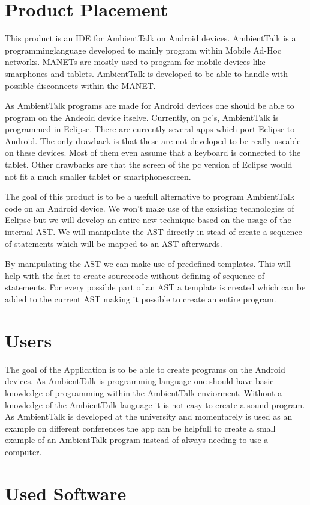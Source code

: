 \documentclass[a4paper,12pt]{report}
\begin{document}
\section{Product Placement}
This product is an IDE for AmbientTalk on Android devices. AmbientTalk is a programminglanguage developed to mainly program within Mobile Ad-Hoc networks. MANETs are mostly used to program
for mobile devices like smarphones and tablets. AmbientTalk is developed to be able to handle with possible disconnects within the MANET.

As AmbientTalk programs are made for Android devices one should be able to program on the Andeoid device itselve. Currently, on pc's, AmbientTalk is programmed in Eclipse. There are currently
several apps which port Eclipse to Android. The only drawback is that these are not developed to be really useable on these devices. Most of them even assume that a keyboard is connected to the
tablet. Other drawbacks are that the screen of the pc version of Eclipse would not fit a much smaller tablet or smartphonescreen.   

The goal of this product is to be a usefull alternative to program AmbientTalk code on an Android device. We won't make use of the exsisting technologies of Eclipse but we will develop an entire
new technique based on the usage of the internal AST. We will manipulate the AST directly in stead of create a sequence of statements which will be mapped to an AST afterwards.

By manipulating the AST we can make use of predefined templates. This will help with the fact to create sourcecode without defining of sequence of statements. For every possible part of an AST
a template is created which can be added to the current AST making it possible to create an entire program. 
\section{Users}
The goal of the Application is to be able to create programs on the Android devices. As AmbientTalk is programming language one should have basic knowledge of programming within the AmbientTalk
enviorment. Without a knowledge of the AmbientTalk language it is not easy to create a sound program.
As AmbientTalk is developed at the university and momentarely is used as an example on different conferences the app can be helpfull to create a small example of an AmbientTalk program instead 
of always needing to use a computer.

\section{Used Software}
\end{document}
